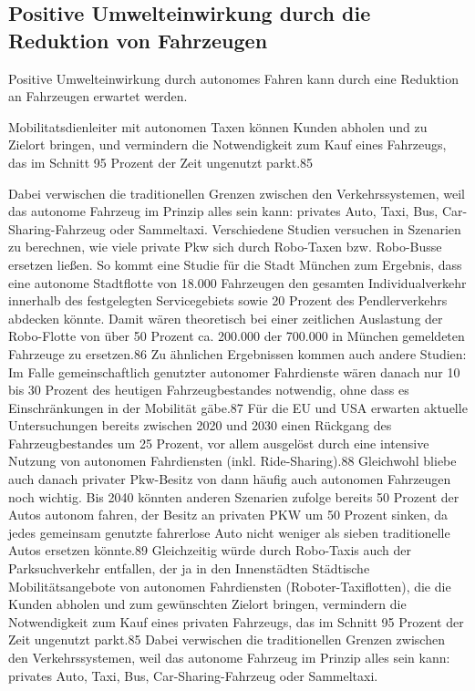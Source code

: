 \subsection{Positive Umwelteinwirkung durch die Reduktion von Fahrzeugen}
Positive Umwelteinwirkung durch autonomes Fahren kann durch eine
Reduktion an Fahrzeugen erwartet werden.

Mobilitatsdienleiter mit autonomen Taxen können
Kunden abholen und zu Zielort bringen,
und vermindern die Notwendigkeit zum Kauf eines Fahrzeugs,
das im Schnitt 95 Prozent der Zeit ungenutzt parkt.85

Dabei verwischen die traditionellen Grenzen zwischen den
Verkehrssystemen, weil das autonome Fahrzeug im Prinzip alles sein kann: privates Auto, Taxi, Bus, Car-Sharing-Fahrzeug oder Sammeltaxi.
Verschiedene Studien versuchen in Szenarien zu berechnen, wie viele private
Pkw sich durch Robo-Taxen bzw. Robo-Busse ersetzen ließen. So kommt eine Studie für die Stadt München zum Ergebnis, dass eine autonome Stadtflotte von 18.000
Fahrzeugen den gesamten Individualverkehr innerhalb des festgelegten Servicegebiets sowie 20 Prozent des Pendlerverkehrs abdecken könnte. Damit wären
theoretisch bei einer zeitlichen Auslastung der Robo-Flotte von über 50 Prozent
ca. 200.000 der 700.000 in München gemeldeten Fahrzeuge zu ersetzen.86
Zu ähnlichen Ergebnissen kommen auch andere Studien: Im Falle gemeinschaftlich genutzter autonomer Fahrdienste wären danach nur 10 bis 30 Prozent
des heutigen Fahrzeugbestandes notwendig, ohne dass es Einschränkungen in der
Mobilität gäbe.87
Für die EU und USA erwarten aktuelle Untersuchungen bereits
zwischen 2020 und 2030 einen Rückgang des Fahrzeugbestandes um 25 Prozent,
vor allem ausgelöst durch eine intensive Nutzung von autonomen Fahrdiensten
(inkl. Ride-Sharing).88
Gleichwohl bliebe auch danach privater Pkw-Besitz von
dann häufig auch autonomen Fahrzeugen noch wichtig.
Bis 2040 könnten anderen Szenarien zufolge bereits 50 Prozent der Autos autonom fahren, der Besitz an privaten PKW um 50 Prozent sinken, da jedes gemeinsam genutzte fahrerlose Auto
nicht weniger als sieben traditionelle Autos ersetzen könnte.89
Gleichzeitig würde durch Robo-Taxis auch der Parksuchverkehr entfallen, der ja in den Innenstädten
Städtische Mobilitätsangebote von autonomen Fahrdiensten (Roboter-Taxiflotten),
die die Kunden abholen und zum gewünschten Zielort bringen, vermindern die
Notwendigkeit zum Kauf eines privaten Fahrzeugs, das im Schnitt 95 Prozent der
Zeit ungenutzt parkt.85
Dabei verwischen die traditionellen Grenzen zwischen den
Verkehrssystemen, weil das autonome Fahrzeug im Prinzip alles sein kann: privates Auto, Taxi, Bus, Car-Sharing-Fahrzeug oder Sammeltaxi.
